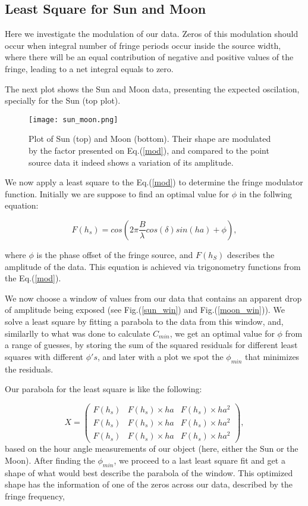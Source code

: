 \documentclass{article}
\begin{document}
\subsection{Least Square for Sun and Moon}

Here we investigate the modulation of our data. Zeros of this modulation
should occur when integral number of fringe periods occur inside the
source width, where there will be an equal contribution of negative and
positive values of the fringe, leading to a net integral equals to zero.

The next plot shows the Sun and Moon data, presenting the expected
oscilation, specially for the Sun (top plot).  

\begin{figure}[H]
\center
\texttt{[image: sun\_moon.png]}
\caption {Plot of Sun (top) and Moon (bottom). Their shape are modulated
by the factor presented on Eq.(\ref{mod}), and compared to the point
source data it indeed shows a variation of its amplitude.} 
\label{Fig:3}
\end{figure}

We now apply a least square to the Eq.(\ref{mod}) to determine the
fringe modulator function. Initially we are suppose to find an optimal
value for $\phi$ in the follwing equation:

\begin{equation}
F(h_{s}) = cos(2\pi \frac{B}{\lambda}  cos(\delta)  sin(ha) + \phi),
\label{modd}
\end{equation} 

where $\phi$ is the phase offset of the fringe source, and $F(h_{S})$
describes the amplitude of the data. This equation is achieved via
trigonometry functions from the Eq.(\ref{mod}).

We now choose a window of values from our data that contains an apparent
drop of amplitude being exposed (see Fig.(\ref{sun_win}) and Fig.(\ref{moon_win})). We solve a least square by fitting a
parabola to the data from this window, and, similarlly to what was done
to calculate $C_{min}$, we get an optimal value for $\phi$ from a
range of guesses, by storing the sum of the squared residuals for
different least squares with different $\phi's$, and later with a plot
we spot the $\phi_{min}$ that minimizes the residuals.

Our parabola for the least square is like the following:

\begin{equation}
X =
 \begin{pmatrix}
  F(h_{s}) & F(h_{s}) \times ha & F(h_{s}) \times ha^{2} \\
  F(h_{s}) & F(h_{s}) \times ha & F(h_{s}) \times ha^{2}\\  
  F(h_{s}) & F(h_{s}) \times ha & F(h_{s}) \times ha^{2}
 \end{pmatrix},
\end{equation}
based on the hour angle measurements of our object (here, either the Sun
or the Moon). After finding the $\phi_{min}$, we proceed to a last least
square fit and get a shape of what would best describe the parabola of
the window. This optimized shape has the information of one of the zeros
across our data, described by the fringe frequency,
\end{document}
